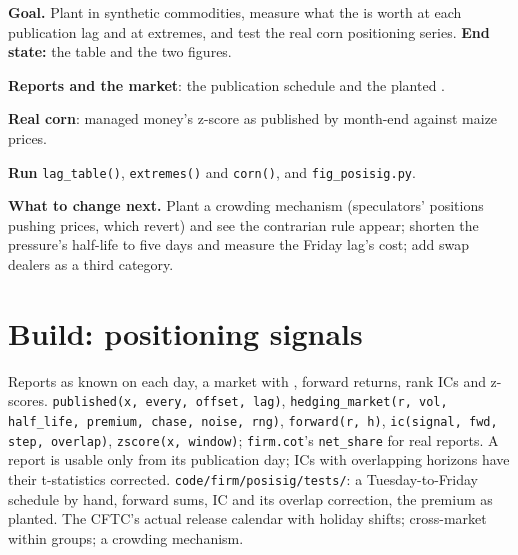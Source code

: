 \begin{tutorial}
\textbf{Goal.} Plant  in synthetic commodities, measure what the  is worth at each publication lag and at extremes,
and test the real corn positioning series. \textbf{End state:} the table and the two figures.
\begin{tutsteps}
\item \textbf{Reports and the market}: the publication schedule and the planted .
\label{lst:s1:positioning-and-sentiment:model}
\item \textbf{Real corn}: managed money's z-score as published by month-end against maize prices.
\label{lst:s1:positioning-and-sentiment:corn}
\item \textbf{Run} \texttt{lag\_table()}, \texttt{extremes()} and \texttt{corn()}, and \texttt{fig\_posisig.py}.
\end{tutsteps}
\textbf{What to change next.} Plant a crowding mechanism (speculators' positions pushing prices, which revert) and see the contrarian rule appear;
shorten the pressure's half-life to five days and measure the Friday lag's cost; add swap dealers as a third category.
\end{tutorial}

\section{Build: positioning signals}\label{bld:s1:positioning-and-sentiment:posisig}

\begin{build}
 Reports as known on each day, a market with , forward returns, rank ICs and z-scores.
 \texttt{published(x, every, offset, lag)}, \texttt{hedging\_market(r, vol, half\_life, premium, chase, noise, rng)},
\texttt{forward(r, h)}, \texttt{ic(signal, fwd, step, overlap)}, \texttt{zscore(x, window)}; \texttt{firm.cot}'s \texttt{net\_share} for real reports.
 A report is usable only from its publication day; ICs with overlapping horizons have their t-statistics corrected.
 \texttt{code/firm/posisig/tests/}: a Tuesday-to-Friday schedule by hand, forward sums, IC and its overlap correction, the
premium as planted.
 The CFTC's actual release calendar with holiday shifts; cross-market  within groups; a crowding mechanism.
\end{build}

